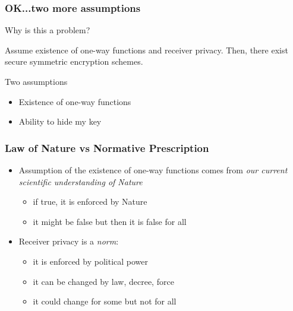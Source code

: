 \documentclass[]{beamer}
\begin{document}
\begin{frame}
\frametitle{OK...two more assumptions}

Why is this a problem?

\begin{theorem}
Assume 
{\color{brown} existence of one-way functions} 
and 
{\color{brown} receiver privacy}.
Then, there exist secure symmetric encryption schemes.
\end{theorem}

\vfill
\begin{block}{Two assumptions}
\begin{itemize}
\item Existence of one-way functions
\item Ability to hide my key
\end{itemize}
\end{block}
\end{frame}

\begin{frame}
\frametitle{Law of Nature vs Normative Prescription}

\begin{itemize}
\item {\color{green} Assumption of the existence of one-way functions comes from
{\em our current scientific understanding of Nature}}
 
    \begin{itemize}
        \item {\color{brown}if true, it is enforced by Nature}
        \item {\color{brown}it might be false but then it is false for all}
    \end{itemize}
\vskip 1cm
\item {\color{green} Receiver privacy is a {\em norm}: }
    
    \begin{itemize}
        \item {\color{brown} it is enforced by political power}
        \item {\color{brown} it can be changed by law, decree, force}
        \item {\color{brown} it could change for some but not for all}
    \end{itemize}
\end{itemize}

\end{frame}
\end{document}
